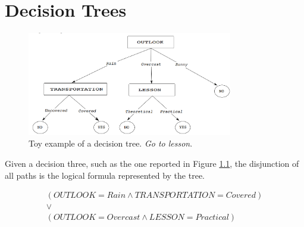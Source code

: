 \chapter{Decision Trees}
\label{cha:decision_trees}

\begin{figure}[H]
	\centering
	\includegraphics[width=0.8\textwidth]{
		images/02_DecisionTrees_decisionTree1.png
	}
	\caption{Toy example of a decision tree. \textit{Go to lesson}.}
	\label{dt_example}
\end{figure}

Given a decision three, such as the one reported in Figure \ref{dt_example}, the
disjunction of all paths is the logical formula represented by the tree.


\begin{gather*}
	(\mathit{OUTLOOK}=\mathit{Rain}\wedge \mathit{TRANSPORTATION}=\mathit{Covered})
	\\ \vee \\ (\mathit{OUTLOOK}=\mathit{Overcast}\wedge \mathit{LESSON}=\mathit{Practical}
	)
\end{gather*}

